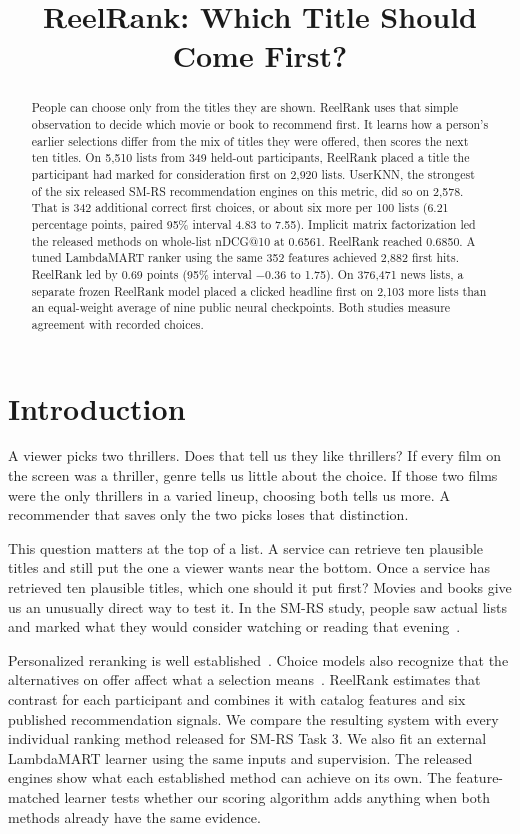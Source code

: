 \documentclass[11pt,onecolumn,conference,letterpaper]{IEEEtran}
\title{ReelRank: Which Title Should Come First?}
\author{\IEEEauthorblockN{Usman Mehboob Mohammed, Moin Palekar, Omkar Rajesh Hundekari,\\
Aryan Tripathi, Badri Sri Vaishnavi Yeluri, and Arya Ravindra Patil}
\IEEEauthorblockA{Arizona State University\quad / \quad CSE 575, Statistical Machine Learning}}
\begin{document}
\pagestyle{coursepaper}
\maketitle
\thispagestyle{coursepaper}
\begin{abstract}
People can choose only from the titles they are shown. ReelRank uses that simple observation to decide which movie or book to recommend first. It learns how a person's earlier selections differ from the mix of titles they were offered, then scores the next ten titles. On 5,510 lists from 349 held-out participants, ReelRank placed a title the participant had marked for consideration first on 2,920 lists. UserKNN, the strongest of the six released SM-RS recommendation engines on this metric, did so on 2,578. That is 342 additional correct first choices, or about six more per 100 lists (6.21 percentage points, paired 95\% interval 4.83 to 7.55). Implicit matrix factorization led the released methods on whole-list nDCG@10 at 0.6561. ReelRank reached 0.6850. A tuned LambdaMART ranker using the same 352 features achieved 2,882 first hits. ReelRank led by 0.69 points (95\% interval $-0.36$ to 1.75). On 376,471 news lists, a separate frozen ReelRank model placed a clicked headline first on 2,103 more lists than an equal-weight average of nine public neural checkpoints. Both studies measure agreement with recorded choices.
\end{abstract}

\section{Introduction}
A viewer picks two thrillers. Does that tell us they like thrillers? If every film on the screen was a thriller, genre tells us little about the choice. If those two films were the only thrillers in a varied lineup, choosing both tells us more. A recommender that saves only the two picks loses that distinction.

This question matters at the top of a list. A service can retrieve ten plausible titles and still put the one a viewer wants near the bottom. Once a service has retrieved ten plausible titles, which one should it put first? Movies and books give us an unusually direct way to test it. In the SM-RS study, people saw actual lists and marked what they would consider watching or reading that evening~\cite{smrs,smrs2}.

Personalized reranking is well established~\cite{pei}. Choice models also recognize that the alternatives on offer affect what a selection means~\cite{choice}. ReelRank estimates that contrast for each participant and combines it with catalog features and six published recommendation signals. We compare the resulting system with every individual ranking method released for SM-RS Task 3. We also fit an external LambdaMART learner using the same inputs and supervision. The released engines show what each established method can achieve on its own. The feature-matched learner tests whether our scoring algorithm adds anything when both methods already have the same evidence.
\end{document}
